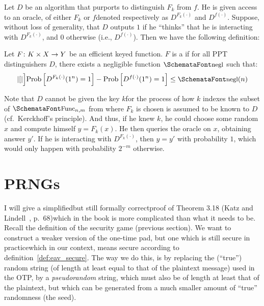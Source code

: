   Let $D$ be an algorithm that purports to distinguish $F_k$ from $f$. He is given access to an oracle, of either $F_k$ or $f$\emd denoted respectively as $D^{F_k(\cdot)}$ and $D^{f(\cdot)}$. Suppose, without loss of generality, that $D$ outputs $1$ if he ``thinks'' that he is interacting with $D^{F_k(\cdot)}$, and $0$ otherwise (i.e., $D^{f(\cdot)}$). Then we have the following definition:
  \begin{definition}
    \label{def:prf}
    Let $F\colon K\times X \rightarrow Y$ be an efficient keyed function. $F$ is a   if for all PPT distinguishers $D$, there exists a negligible function $\myemph{negl}$ such that:
    \begin{equation}
      \abs*[\Big]{\textup{Prob}\left[D^{F_k(\cdot)}(1^n) = 1\right] - \textup{Prob}\left[D^{f(\cdot)}(1^n) = 1\right]} \le  \myemph{negl}(n)
    \end{equation}
  \end{definition}
  \noindent Note that $D$ cannot be given the key $k$\emd for the process of how $k$ indexes the subset of $\sgg{Func}_{n, m}$ from where $F_k$ is chosen is assumed to be known to $D$ (cf.\ Kerckhoff's principle). And thus, if he knew $k$, he could choose some random $x$ and compute himself $y = F_k(x)$. He then queries the oracle on $x$, obtaining answer $y'$. If he is interacting with $D^{F_k(\cdot)}$, then $y=y'$ with probability $1$, which would only happen with probability $2^{-m}$ otherwise.

\section{PRNGs}
  \label{sec:prng}
  I will give a simplified\emd but still formally correct\emd proof of Theorem 3.18 (Katz and Lindell~\cite{KatzLindell:IMC}, p.\ 68)\emd which in the book is more complicated than what it needs to be. Recall the definition of the security game \privkeav (previous section). We want to construct a weaker version of the one-time pad, but one which is still secure in practice\emd which in our context, means secure according to definition~\ref{def:eav_secure}. The way we do this, is by replacing the (``true'') random string (of length at least equal to that of the plaintext message) used in the OTP, by a \emph{pseudorandom} string, which must also be of length at least that of the plaintext, but which can be generated from a much smaller amount of ``true'' randomness (the seed).

